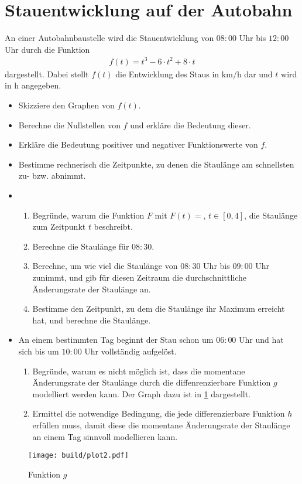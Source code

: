 



\section{Stauentwicklung auf der Autobahn}

An einer Autobahnbaustelle wird die Stauentwicklung von $08:00$ Uhr bis $12:00$ Uhr durch die Funktion
\begin{align*}
    f(t) = t^3-6\cdot t^2+8\cdot t
\end{align*}
dargestellt.
Dabei stellt $f(t)$ die Entwicklung des Staus in $\si{\kilo\meter\per\hour}$ dar und $t$ wird in $\si{\hour}$ angegeben.

\begin{itemize}
    \item Skizziere den Graphen von $f(t)$.
    \item Berechne die Nullstellen von $f$ und erkläre die Bedeutung dieser.
    \item Erkläre die Bedeutung positiver und negativer Funktionswerte von $f$.
    \item Bestimme rechnerisch die Zeitpunkte, zu denen die Staulänge am schnellsten zu- bzw. abnimmt.
    \item
        \begin{enumerate}
            \item Begründe, warum die Funktion $F$ mit $F(t) = $, $t \in \left[0,4\right]$, die Staulänge zum Zeitpunkt $t$ beschreibt.
            \item Berechne die Staulänge für $08:30$.
            \item Berechne, um wie viel die Staulänge von $08:30$ Uhr bis $09:00$ Uhr zunimmt, und gib für diesen Zeitraum die durchschnittliche Änderungsrate der Staulänge an.
            \item Bestimme den Zeitpunkt, zu dem die Staulänge ihr Maximum erreicht hat, und berechne die Staulänge.
        \end{enumerate}
    \item An einem bestimmten Tag beginnt der Stau schon um $06:00$ Uhr und hat sich bis um $10:00$ Uhr vollständig aufgelöst.
        \begin{enumerate}
            \item Begründe, warum es nicht möglich ist, dass die momentane Änderungsrate der Staulänge durch die diffenrenzierbare Funktion $g$ modelliert werden kann.
                Der Graph dazu ist in \ref{fig:g} dargestellt.
            \item Ermittel die notwendige Bedingung, die jede differenzierbare Funktion $h$ erfüllen muss, damit diese die momentane Änderungsrate der Staulänge an einem Tag sinnvoll modellieren kann.
        \end{enumerate}
\end{itemize}
\begin{figure}
    \centering
    \texttt{[image: build/plot2.pdf]}
    \caption{Funktion $g$}
    \label{fig:g}
\end{figure}



